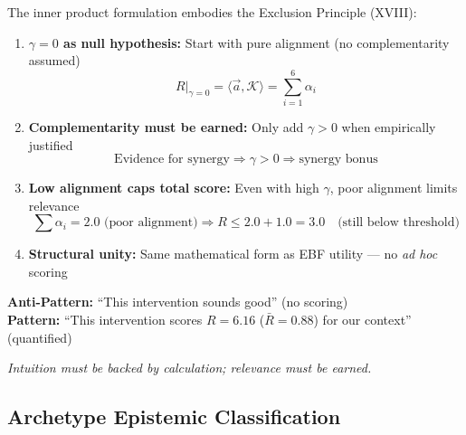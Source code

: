 \begin{tcolorbox}[colback=red!5!white, colframe=red!75!black,
    title=\textbf{Methodological Note: XVIII Exclusion Principle in Scoring}]

The inner product formulation embodies the Exclusion Principle (XVIII):

\begin{enumerate}[nosep]
    \item \textbf{$\gamma = 0$ as null hypothesis:} Start with pure alignment (no complementarity assumed)
    \begin{equation*}
    R|_{\gamma=0} = \langle \vec{a}, \mathcal{K} \rangle = \sum_{i=1}^{6} \alpha_i
    \end{equation*}

    \item \textbf{Complementarity must be earned:} Only add $\gamma > 0$ when empirically justified
    \begin{equation*}
    \text{Evidence for synergy} \Rightarrow \gamma > 0 \Rightarrow \text{synergy bonus}
    \end{equation*}

    \item \textbf{Low alignment caps total score:} Even with high $\gamma$, poor alignment limits relevance
    \begin{equation*}
    \sum \alpha_i = 2.0 \text{ (poor alignment)} \Rightarrow R \leq 2.0 + 1.0 = 3.0 \quad \text{(still below threshold)}
    \end{equation*}

    \item \textbf{Structural unity:} Same mathematical form as EBF utility --- no \textit{ad hoc} scoring
\end{enumerate}

\textbf{Anti-Pattern:} ``This intervention sounds good'' (no scoring)\\
\textbf{Pattern:} ``This intervention scores $R = 6.16$ ($\bar{R} = 0.88$) for our context'' (quantified)

\textit{Intuition must be backed by calculation; relevance must be earned.}
\end{tcolorbox}


\subsection{Archetype Epistemic Classification}
\label{sec:hhh-archetype-epistemic}

